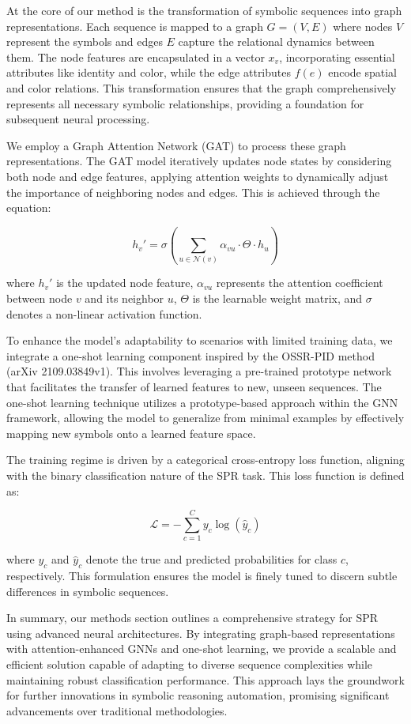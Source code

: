 \documentclass{article}
\begin{document}
At the core of our method is the transformation of symbolic sequences into graph representations. Each sequence is mapped to a graph \( G = (V, E) \) where nodes \( V \) represent the symbols and edges \( E \) capture the relational dynamics between them. The node features are encapsulated in a vector \( x_v \), incorporating essential attributes like identity and color, while the edge attributes \( f(e) \) encode spatial and color relations. This transformation ensures that the graph comprehensively represents all necessary symbolic relationships, providing a foundation for subsequent neural processing.

We employ a Graph Attention Network (GAT) to process these graph representations. The GAT model iteratively updates node states by considering both node and edge features, applying attention weights to dynamically adjust the importance of neighboring nodes and edges. This is achieved through the equation:

\[
h_v' = \sigma\left( \sum_{u \in \mathcal{N}(v)} \alpha_{vu} \cdot \Theta \cdot h_u \right)
\]

where \( h_v' \) is the updated node feature, \( \alpha_{vu} \) represents the attention coefficient between node \( v \) and its neighbor \( u \), \( \Theta \) is the learnable weight matrix, and \( \sigma \) denotes a non-linear activation function.

To enhance the model's adaptability to scenarios with limited training data, we integrate a one-shot learning component inspired by the OSSR-PID method (arXiv 2109.03849v1). This involves leveraging a pre-trained prototype network that facilitates the transfer of learned features to new, unseen sequences. The one-shot learning technique utilizes a prototype-based approach within the GNN framework, allowing the model to generalize from minimal examples by effectively mapping new symbols onto a learned feature space.

The training regime is driven by a categorical cross-entropy loss function, aligning with the binary classification nature of the SPR task. This loss function is defined as:

\[
\mathcal{L} = -\sum_{c=1}^{C} y_c \log(\hat{y}_c)
\]

where \( y_c \) and \( \hat{y}_c \) denote the true and predicted probabilities for class \( c \), respectively. This formulation ensures the model is finely tuned to discern subtle differences in symbolic sequences.

In summary, our methods section outlines a comprehensive strategy for SPR using advanced neural architectures. By integrating graph-based representations with attention-enhanced GNNs and one-shot learning, we provide a scalable and efficient solution capable of adapting to diverse sequence complexities while maintaining robust classification performance. This approach lays the groundwork for further innovations in symbolic reasoning automation, promising significant advancements over traditional methodologies.
\end{document}
